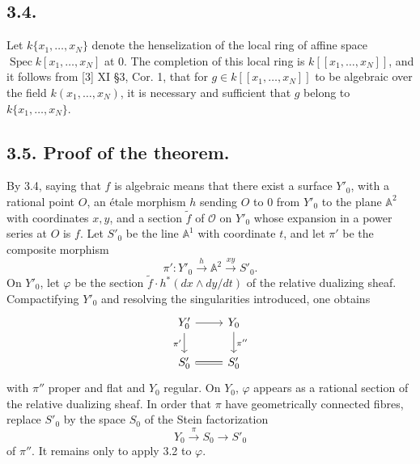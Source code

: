 \documentclass[11pt]{article}
\DeclareMathOperator{\Spec}{Spec}
\newcommand{\OO}{\mathcal O}
\newcommand{\Aaff}{\mathbb A}
\begin{document}
\subsection*{3.4.}
Let $k\{x_1,\ldots,x_N\}$ denote the henselization of the local ring of affine space $\Spec k[x_1,\ldots,x_N]$ at 0. The completion of this local ring is $k[[x_1,\ldots,x_N]]$, and it follows from [3] XI §3, Cor. 1, that for $g\in k[[x_1,\ldots,x_N]]$ to be algebraic over the field $k(x_1,\ldots,x_N)$, it is necessary and sufficient that $g$ belong to $k\{x_1,\ldots,x_N\}$.

\subsection*{3.5. Proof of the theorem.}
By 3.4, saying that $f$ is algebraic means that there exist a surface $Y'_0$, with a rational point $O$, an étale morphism $h$ sending $O$ to $0$ from $Y'_0$ to the plane $\Aaff^2$ with coordinates $x,y$, and a section $\widetilde f$ of $\OO$ on $Y'_0$ whose expansion in a power series at $O$ is $f$. Let $S'_0$ be the line $\Aaff^1$ with coordinate $t$, and let $\pi'$ be the composite morphism
\[
        \pi':Y'_0\xrightarrow{h}\Aaff^2\xrightarrow{xy}S'_0.
\]
On $Y'_0$, let $\varphi$ be the section $\widetilde f\cdot h^*(dx\wedge dy/dt)$ of the relative dualizing sheaf. Compactifying $Y'_0$ and resolving the singularities introduced, one obtains
\[
\begin{tikzcd}
Y'_0 \arrow[r] \arrow[d,"\pi'"'] & Y_0 \arrow[d,"\pi''"] \\
S'_0 \arrow[r,equal] & S'_0
\end{tikzcd}
\]
with $\pi''$ proper and flat and $Y_0$ regular. On $Y_0$, $\varphi$ appears as a rational section of the relative dualizing sheaf. In order that $\pi$ have geometrically connected fibres, replace $S'_0$ by the space $S_0$ of the Stein factorization
\[
        Y_0\xrightarrow{\pi}S_0\longrightarrow S'_0
\]
of $\pi''$. It remains only to apply 3.2 to $\varphi$.
\end{document}
